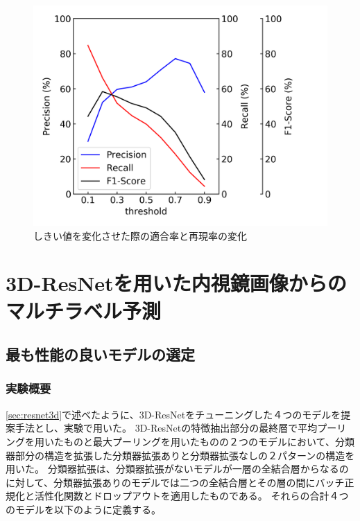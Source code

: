 \begin{figure}[htbp]
    \begin{center}
        \includegraphics[width=150mm]{./fig/densenet121threshold.png}
        \caption{しきい値を変化させた際の適合率と再現率の変化}
        \label{fig:densenet121_result_threshold}
    \end{center}
\end{figure}

\newpage
\section{3D-ResNetを用いた内視鏡画像からのマルチラベル予測}
\subsection{最も性能の良いモデルの選定}
\label{sec:ex2}
\subsubsection{実験概要}
\ref{sec:resnet3d}で述べたように、3D-ResNetをチューニングした４つのモデルを提案手法とし、実験で用いた。
3D-ResNetの特徴抽出部分の最終層で平均プーリングを用いたものと最大プーリングを用いたものの２つのモデルにおいて、分類器部分の構造を拡張した分類器拡張ありと分類器拡張なしの２パターンの構造を用いた。
分類器拡張は、分類器拡張がないモデルが一層の全結合層からなるのに対して、分類器拡張ありのモデルでは二つの全結合層とその層の間にバッチ正規化と活性化関数とドロップアウトを適用したものである。
それらの合計４つのモデルを以下のように定義する。

